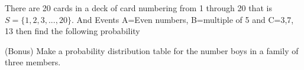 \documentclass[11pt]{exam}
\begin{document}
\begin{questions}
\vspace{10cm}

\addpoints
\question[15]  There are 20 cards in a deck of card numbering from 1 through 20 that is $S=\{1, 2, 3, ...,20\}$. And Events A={Even numbers}, B={multiple of 5} and C={3,7, 13} then find the following probability



\vspace{10cm}
\addpoints
\question[5:] (Bonus) Make a probability distribution table for the number boys in a family of three members. 
\end{questions}
\end{document}
